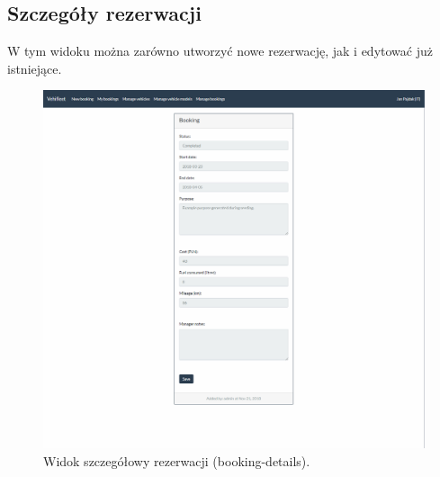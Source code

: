 \documentclass[eng,printmode,openany]{mgr}
\begin{document}
\begin{appendices}
		\section{Szczegóły rezerwacji}
		W tym widoku można zarówno utworzyć nowe rezerwację, jak i edytować już istniejące.
		\begin{figure}[H]
			\centering
			\includegraphics[width=\textwidth]{images/views/booking-detail.png}
			\caption{Widok szczegółowy rezerwacji (booking-details).} 		
		\end{figure}
		
		\newpage	

\end{appendices}
\end{document}
